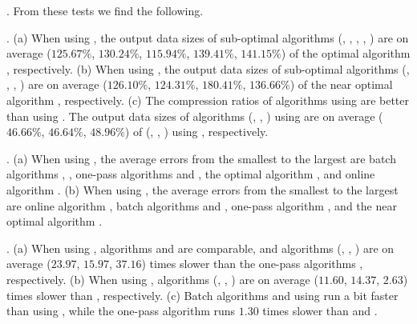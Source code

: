 
.
From these tests we find the following.

\emph{}. 
(a) When using \ped, the output data sizes of sub-optimal algorithms (\tpa,
\dpa, \bqsa, \siped, \operb) are on average ($125.67\%$, $130.24\%$, $115.94\%$, $139.41\%$, $141.15\%$)
of the optimal algorithm \optp, respectively.
(b) When using \sed, the output data sizes of sub-optimal algorithms (\tpa,
\dpa, \squishe, \cised) are on average ($126.10\%$, $124.31\%$, $180.41\%$, $136.66\%$) of the near optimal algorithm \nopts, respectively.
(c) The compression ratios of algorithms using \ped are better than
using \sed. The output data sizes of algorithms (\optp, \tpa, \dpa) using \ped
are on average ($46.66\%$, $46.64\%$, $48.96\%$) of (\nopts, \tpa, \dpa) using \sed, respectively.

\emph{}. 
(a) When using \ped, the average errors from the smallest to the largest are batch algorithms \tpa, \dpa, one-pass algorithms \siped and \operb, the optimal algorithm \optp, and online algorithm \bqsa. 
(b) When using \sed, the average errors from the smallest to the largest are online algorithm \squishe, batch algorithms \tpa and \dpa, one-pass algorithm \cised, and the near optimal algorithm \nopts.

\emph{}.
(a) When using \ped, algorithms \siped and \operb are comparable, and algorithms
(\tpa, \dpa, \bqsa) are on average ($23.97$, $15.97$, $37.16$) times slower than the one-pass algorithms \siped, respectively. 
(b) When using \sed, algorithms (\tpa, \dpa, \squishe) are on average ($11.60$, $14.37$, $2.63$) times slower than \cised, respectively.
(c) Batch algorithms \dpa and \tpa using \sed run a bit faster than using \ped, while the one-pass algorithm \cised runs {$1.30$} times slower than \siped and \operb.




